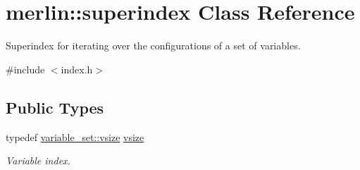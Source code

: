 \hypertarget{classmerlin_1_1superindex}{}\section{merlin\+:\+:superindex Class Reference}
\label{classmerlin_1_1superindex}


Superindex for iterating over the configurations of a set of variables.  




{\ttfamily \#include $<$index.\+h$>$}

\subsection*{Public Types}
\begin{DoxyCompactItemize}
\item 
\hypertarget{classmerlin_1_1superindex_a4e63d0617c6b351c664cdfd406686d62}{}typedef \hyperlink{classmerlin_1_1variable__set_a05d7a8291564fa7fb236a5e9cb65c734}{variable\+\_\+set\+::vsize} \hyperlink{classmerlin_1_1superindex_a4e63d0617c6b351c664cdfd406686d62}{vsize}\label{classmerlin_1_1superindex_a4e63d0617c6b351c664cdfd406686d62}

\begin{DoxyCompactList}\small\item\em Variable index. \end{DoxyCompactList}\end{DoxyCompactItemize}
